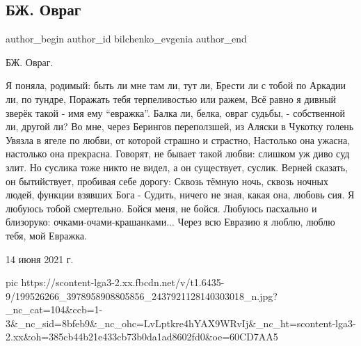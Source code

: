 
 
 
 
 
 
\subsection{БЖ. Овраг}
\label{sec:14_06_2021.fb.bilchenko_evgenia.2.ovrag}
\ifcmt
 author_begin
   author_id bilchenko_evgenia
 author_end
\fi

БЖ. Овраг.

Я поняла, родимый: быть ли мне там ли, тут ли,
Брести ли с тобой по Аркадии ли, по тундре,
Поражать тебя терпеливостью или ражем,
Всё равно я дивный зверёк такой - имя ему  \enquote{евражка}.
Балка ли, белка, овраг судьбы, - собственной ли, другой ли?
Во мне, через Берингов переползшей, из Аляски в Чукотку голень
Увязла в ягеле по любви, от которой страшно и страстно,
Настолько она ужасна, настолько она прекрасна.
Говорят, не бывает такой любви: слишком уж диво суд злит.
Но суслика тоже никто не видел, а он существует, суслик.
Верней сказать, он бытийствует, пробивая себе дорогу:
Сквозь тёмную ночь, сквозь ночных людей, функции взявших Бога -
Судить, ничего не зная, какая она, любовь сия.
Я любуюсь тобой смертельно. Бойся меня, не бойся.
Любуюсь пасхально и близоруко: очками-очами-крашанками...
Через всю Евразию я люблю, люблю тебя, мой Евражка.

14 июня 2021 г.

\ifcmt
  pic https://scontent-lga3-2.xx.fbcdn.net/v/t1.6435-9/199526266_3978958908805856_2437921128140303018_n.jpg?_nc_cat=104&ccb=1-3&_nc_sid=8bfeb9&_nc_ohc=LvLptkre4hYAX9WRvIj&_nc_ht=scontent-lga3-2.xx&oh=385cb44b21e433cb73b0da1ad8602fd0&oe=60CD7AA5
\fi
